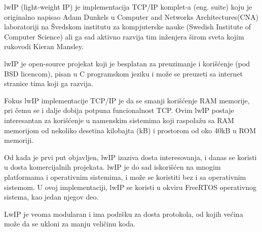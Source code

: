 \documentclass[a4paper,12pt, master]{etf}
\begin{document}
	lwIP (light-weight IP) je implementacija TCP/IP komplet-a (eng\@. suite)
    koju je originalno napisao Adam Dunkels u Computer and Networks
    Architectures(CNA) laboratoriji na \v{S}vedskom institutu za kompjuterske
    nauke (Swedish Institute of Computer Science) ali ga sad aktivno razvija tim
    in\v{z}enjera \v{s}irom sveta kojim rukovodi Kieran Mansley\@.

	lwIP je open-source projekat koji je besplatan za preuzimanje i
	kori\v{s}\'{c}enje (pod BSD	licencom), pisan u C programskom jeziku i
	mo\v{z}e se preuzeti sa internet stranice tima koji	ga razvija.

	Fokus lwIP implementacije TCP/IP je da se smanji kori\v{s}\'{c}enje RAM
    memorije, pri \v{c}emu  se i dalje dobija potpuna funcionalnost TCP\@. Ovim
    lwIP postaje interesantan za kori\v{s}\'{c}enje u namenskim sistemima koji
	raspola\v{z}u sa RAM memorijom od nekoliko desetina kilobajta (kB) i
	prostorom od oko 40kB u ROM memoriji.

	Od kada je prvi put objavljen, lwIP izaziva dosta interesovanja, i danas se
	koristi u dosta	komercijalnih projekata\@. lwIP je do sad
	iskori\v{s}\'{c}en na mnogim platformama i operativnim sistemima, i
	mo\v{z}e se koristiti bez i sa operativnim sistemom. U ovoj implementaciji,
	lwIP se koristi u okviru FreeRTOS operativnog sistema, kao jedan njegov deo.

	LwIP je veoma modularan i ima podr\v{s}ku za dosta protokola, od kojih
	ve\'{c}ina mo\v{z}e da se ukloni za manju veli\v{c}inu koda.
\end{document}

